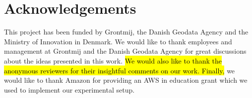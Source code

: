\section{Acknowledgements}
This project has been funded by Grontmij, the Danish Geodata Agency and the Ministry of Innovation in Denmark. We would like to thank employees and management at Grontmij and the Danish Geodata Agency for great discussions about the ideas presented in this work. \hl{We would also like to thank the anonymous reviewers for their insightful comments on our work. Finally,} we would like to thank Amazon for providing an AWS in education grant which we used to implement our experimental setup.  